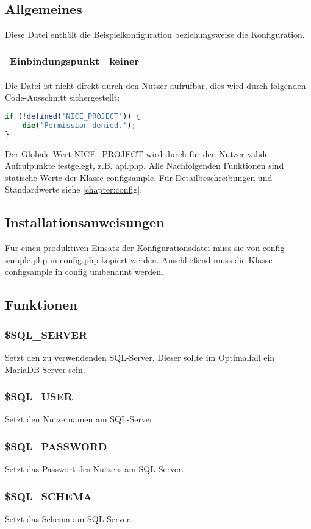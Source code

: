 \subsection{Allgemeines} Diese Datei enthält die Beispielkonfiguration beziehungsweise die Konfiguration.
\begin{table}[H]
	\begin{tabular}{|c|p{11cm}|}
		\hline
		\textbf{Einbindungspunkt} & keiner \\ \hline
	\end{tabular}
\end{table}
Die Datei ist nicht direkt durch den Nutzer aufrufbar, dies wird durch folgenden Code-Ausschnitt sichergestellt:
\begin{lstlisting}[language=php]
if (!defined('NICE_PROJECT')) {
	die('Permission denied.');
}
\end{lstlisting}
Der Globale Wert {\glqq NICE\_PROJECT\grqq} wird durch für den Nutzer valide Aufrufpunkte festgelegt, z.B. {\glqq api.php\grqq}. Alle Nachfolgenden {\glqq Funktionen\grqq} sind statische Werte der Klasse {\glqq configsample\grqq}. Für Detailbeschreibungen und Standardwerte siehe \autoref{chapter:config}.
\subsection{Installationsanweisungen} Für einen produktiven Einsatz der Konfigurationsdatei muss sie von {\glqq config-sample.php\grqq} in {\glqq config.php\grqq} kopiert werden. Anschließend muss die Klasse {\glqq configsample\grqq} in {\glqq config\grqq} umbenannt werden.
\newpage
\subsection{Funktionen}
\subsubsection{\$SQL\_SERVER} Setzt den zu verwendenden SQL-Server. Dieser sollte im Optimalfall ein MariaDB-Server sein.
\subsubsection{\$SQL\_USER} Setzt den Nutzernamen am SQL-Server.
\subsubsection{\$SQL\_PASSWORD} Setzt das Passwort des Nutzers am SQL-Server.
\subsubsection{\$SQL\_SCHEMA} Setzt das Schema am SQL-Server.

